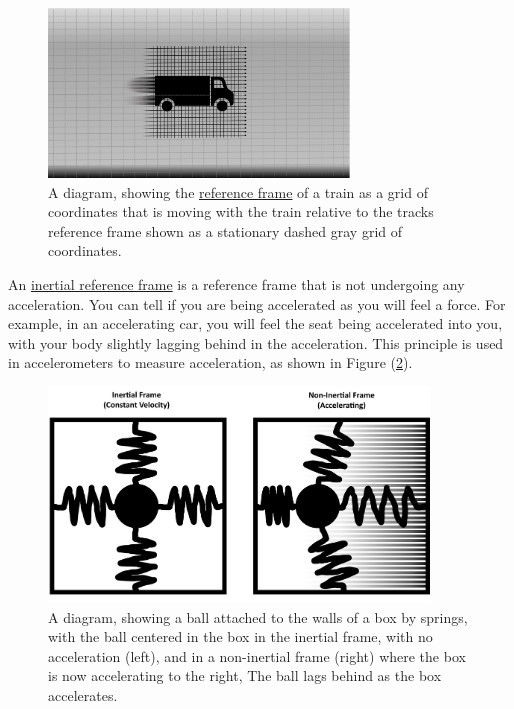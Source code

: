 \begin{figure}[H]
	\centering
	\includegraphics[width=8cm]{images/pdf/Reference_Frames_of_truck_and_road.pdf}
	\caption{A diagram, showing the \protect\hyperlink{def-Reference-frame}{reference frame} of a train as a grid of coordinates that is moving with the train relative to the tracks reference frame shown as a stationary dashed gray grid of coordinates.}
	\label{fig: Reference Frames}
\end{figure}

An \hyperlink{def-Inertial-reference-frame}{inertial reference frame} is a reference frame that is not undergoing any acceleration.
You can tell if you are being accelerated as you will feel a force.
For example, in an accelerating car, you will feel the seat being accelerated into you, with your body slightly lagging behind in the acceleration.
This principle is used in accelerometers to measure acceleration, as shown in Figure (\ref{fig: spring boxes}).

\begin{figure}[H]
	\centering
	\includegraphics[width=0.9\textwidth]{images/pdf/Spring_boxes.pdf}
	\caption{A diagram, showing a ball attached to the walls of a box by springs, with the ball centered in the box in the inertial frame, with no acceleration (left), and in a non-inertial frame (right) where the box is now accelerating to the right, The ball lags behind as the box accelerates.}
	\label{fig: spring boxes}
\end{figure}

